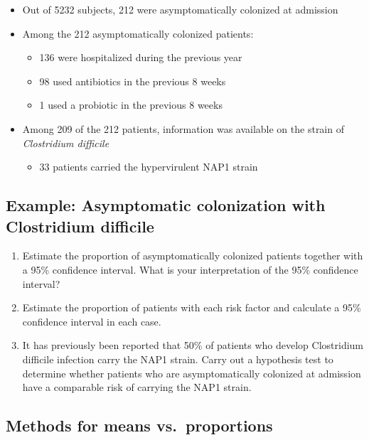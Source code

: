 \documentclass[
]{book}
\providecommand{\tightlist}{%
  \setlength{\itemsep}{0pt}\setlength{\parskip}{0pt}}
\begin{document}
\begin{itemize}
\tightlist
\item
  Out of 5232 subjects, 212 were asymptomatically colonized at admission
\item
  Among the 212 asymptomatically colonized patients:

  \begin{itemize}
  \tightlist
  \item
    136 were hospitalized during the previous year
  \item
    98 used antibiotics in the previous 8 weeks
  \item
    1 used a probiotic in the previous 8 weeks
  \end{itemize}
\item
  Among 209 of the 212 patients, information was available on the strain of \emph{Clostridium difficile}

  \begin{itemize}
  \tightlist
  \item
    33 patients carried the hypervirulent NAP1 strain
  \end{itemize}
\end{itemize}

\hypertarget{example-asymptomatic-colonization-with-clostridium-difficile-1}{%
\subsection{Example: Asymptomatic colonization with Clostridium difficile}\label{example-asymptomatic-colonization-with-clostridium-difficile-1}}

\begin{enumerate}
\def\labelenumi{\alph{enumi})}
\tightlist
\item
  Estimate the proportion of asymptomatically colonized patients together with a 95\% confidence interval. What is your interpretation of the 95\% confidence interval?
\item
  Estimate the proportion of patients with each risk factor and calculate a 95\% confidence interval in each case.
\item
  It has previously been reported that 50\% of patients who develop Clostridium difficile infection carry the NAP1 strain. Carry out a hypothesis test to determine whether patients who are asymptomatically colonized at admission have a comparable risk of carrying the NAP1 strain.
\end{enumerate}

\hypertarget{methods-for-means-vs.-proportions}{%
\subsection{Methods for means vs.~proportions}\label{methods-for-means-vs.-proportions}}
\end{document}
